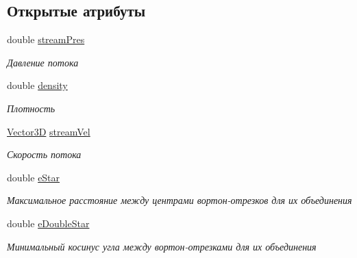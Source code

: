 \subsection*{Открытые атрибуты}
\begin{DoxyCompactItemize}
\item 
\mbox{\label{struct_solver_parameters_ab57d80bfe9a510474ff4f029ddef9e56}} 
double \mbox{\hyperlink{struct_solver_parameters_ab57d80bfe9a510474ff4f029ddef9e56}{stream\+Pres}}
\begin{DoxyCompactList}\small\item\em Давление потока \end{DoxyCompactList}\item 
\mbox{\label{struct_solver_parameters_aa59756e005a1f3ef62c46f60d54f9477}} 
double \mbox{\hyperlink{struct_solver_parameters_aa59756e005a1f3ef62c46f60d54f9477}{density}}
\begin{DoxyCompactList}\small\item\em Плотность \end{DoxyCompactList}\item 
\mbox{\label{struct_solver_parameters_aef2e46ef52faa41a24c1b53ce5968557}} 
\mbox{\hyperlink{class_vector3_d}{Vector3D}} \mbox{\hyperlink{struct_solver_parameters_aef2e46ef52faa41a24c1b53ce5968557}{stream\+Vel}}
\begin{DoxyCompactList}\small\item\em Скорость потока \end{DoxyCompactList}\item 
\mbox{\label{struct_solver_parameters_a4138711eb8ba46d0e9ba4b1005f360f8}} 
double \mbox{\hyperlink{struct_solver_parameters_a4138711eb8ba46d0e9ba4b1005f360f8}{e\+Star}}
\begin{DoxyCompactList}\small\item\em Максимальное расстояние между центрами вортон-\/отрезков для их объединения \end{DoxyCompactList}\item 
\mbox{\label{struct_solver_parameters_a8e427262302ae494d910c799b4660d6c}} 
double \mbox{\hyperlink{struct_solver_parameters_a8e427262302ae494d910c799b4660d6c}{e\+Double\+Star}}
\begin{DoxyCompactList}\small\item\em Минимальный косинус угла между вортон-\/отрезками для их объединения \end{DoxyCompactList}\item 

\end{DoxyCompactItemize}
